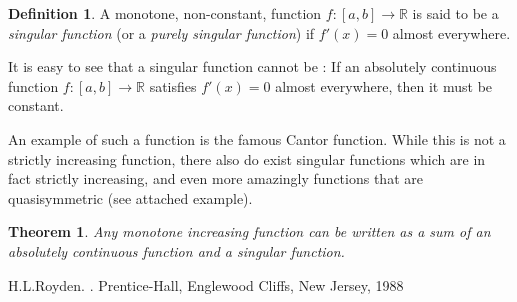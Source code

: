 \documentclass[12pt]{article}
\theoremstyle{theorem}
\newtheorem*{thm}{Theorem}
\theoremstyle{definition}
\newtheorem*{defn}{Definition}
\begin{document}
\begin{defn}
A monotone, non-constant, function $f\colon [a,b] \to {\mathbb{R}}$ is said to be a
{\em singular function} (or a {\em purely singular function}) if $f'(x) = 0$ almost everywhere.
\end{defn}

It is easy to see that a singular function cannot be 
:
If an absolutely continuous function $f \colon [a,b] \to \mathbb{R}$ satisfies $f'(x)=0$ almost everywhere, then it must be constant. 

An example of such a function is the famous Cantor function.
While this is not a strictly increasing function, there also do exist singular functions which are in fact strictly increasing, and even more amazingly functions that are quasisymmetric (see attached example).

\begin{thm}
Any monotone increasing function can be written as a sum of an absolutely continuous function and a singular function.
\end{thm}

\begin{thebibliography}{9}
H.\@ L.\@ Royden.  \emph{}.  Prentice-Hall, Englewood Cliffs, New Jersey, 1988
\end{thebibliography}
\end{document}
